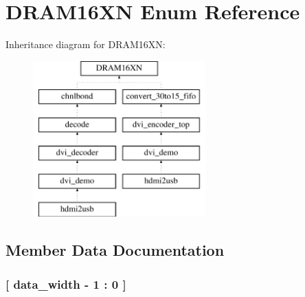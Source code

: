 \section{D\-R\-A\-M16\-X\-N Enum Reference}
\label{enum1_d_r_a_m16_x_n}
Inheritance diagram for D\-R\-A\-M16\-X\-N\-:\begin{figure}[H]
\begin{center}
\leavevmode
\includegraphics[height=6.000000cm]{enum1_d_r_a_m16_x_n}
\end{center}
\end{figure}


\subsection{Member Data Documentation}
\subsubsection[{data\-\_\-width}]{ {\bfseries \textcolor{vhdlchar}{ }} \hspace{0.3cm}}\label{enum1_d_r_a_m16_x_n_abba019faa7c7abc9aa1c648a9ca3d3d1}
\subsubsection[{D\-A\-T\-A\-\_\-\-I\-N}]{ {\bfseries \textcolor{vhdlchar}{[}\textcolor{vhdlchar}{ }{\bfseries {\bf data\-\_\-width}} \textcolor{vhdlchar}{-\/} \textcolor{vhdldigit}{1} \textcolor{vhdlchar}{ }\textcolor{vhdlchar}{\-:}\textcolor{vhdlchar}{ } \textcolor{vhdldigit}{0} \textcolor{vhdlchar}{ }\textcolor{vhdlchar}{]}\textcolor{vhdlchar}{ }} \hspace{0.3cm}}\label{enum1_d_r_a_m16_x_n_aaa4dd3d8d947b074de022381f84c72c3}
